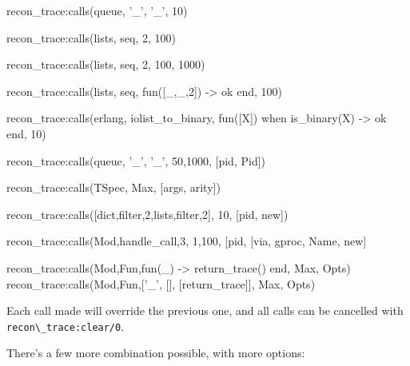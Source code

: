 \documentclass[11pt, oneside]{book}   	%
\newcommand{\function}[1]{\Verb`#1`}
\begin{document}
\begin{VerbatimErl}
recon_trace:calls({queue, '_', '_'}, 10)

recon_trace:calls({lists, seq, 2}, 100)

recon_trace:calls({lists, seq, 2}, {100, 1000})

recon_trace:calls({lists, seq, fun([_,_,2]) -> ok end}, 100)

recon_trace:calls({erlang, iolist_to_binary,
                   fun([X]) when is_binary(X) -> ok end},
                  10)

recon_trace:calls({queue, '_', '_'}, {50,1000}, [{pid, Pid}])

recon_trace:calls(TSpec, Max, [{args, arity}])

recon_trace:calls([{dict,filter,2},{lists,filter,2}], 10, [{pid, new]})

recon_trace:calls({Mod,handle_call,3}, {1,100}, [{pid, [{via, gproc, Name}, new]}

recon_trace:calls({Mod,Fun,fun(_) -> return_trace() end}, Max, Opts)
recon_trace:calls({Mod,Fun,[{'_', [], [{return_trace}]}]}, Max, Opts)

\end{VerbatimErl}

Each call made will override the previous one, and all calls can be cancelled with \function{recon\_trace:clear/0}.

There's a few more combination possible, with more options:
\end{document}
